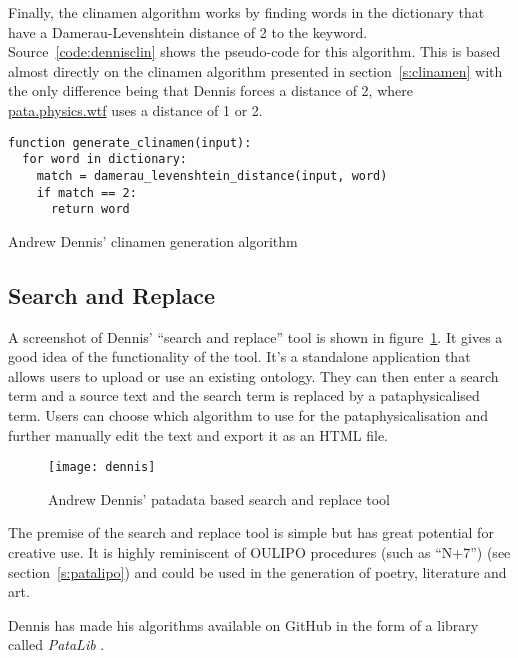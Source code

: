 Finally, the clinamen algorithm works by finding words in the dictionary that have a Damerau-Levenshtein distance of 2 to the keyword. Source~\ref{code:dennisclin} shows the pseudo-code for this algorithm. This is based almost directly on the clinamen algorithm presented in section~\ref{s:clinamen} with the only difference being that Dennis forces a distance of 2, where \url{pata.physics.wtf} uses a distance of 1 or 2.

\begin{listing}[!htbp] %
  \begin{verbatim}
function generate_clinamen(input):
  for word in dictionary:
    match = damerau_levenshtein_distance(input, word)
    if match == 2:
      return word
  \end{verbatim}
\caption[Dennis' clinamen generation]{Andrew Dennis' clinamen generation algorithm}
\label{code:dennisclin}
\end{listing}


\subsection{Search and Replace}

A screenshot of Dennis' ``search and replace'' tool \autocite*{Dennis2016} is shown in figure~\ref{img:dennis}. It gives a good idea of the functionality of the tool. It's a standalone application that allows users to upload or use an existing ontology. They can then enter a search term and a source text and the search term is replaced by a pataphysicalised term. Users can choose which algorithm to use for the pataphysicalisation and further manually edit the text and export it as an \ac{HTML} file.

\begin{figure}[!htbp]
  \centering
  \texttt{[image: dennis]}
\caption[Andrew Dennis' search and replace tool]{Andrew Dennis' patadata based search and replace tool}
\label{img:dennis}
\end{figure}

The premise of the search and replace tool is simple but has great potential for creative use. It is highly reminiscent of \ac{OULIPO} procedures (such as ``N+7'') (see section~\ref{s:patalipo}) and could be used in the generation of poetry, literature and art.

Dennis has made his algorithms available on GitHub in the form of a library called \textit{PataLib} \autocite{Dennis2016a}.

